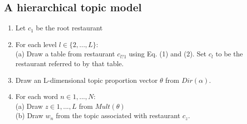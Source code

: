 \documentclass[a4paper]{article}
\begin{document}
\subsection{A hierarchical topic model}

\begin{enumerate}
\item Let $c_1$ be the root restaurant
\item For each level $l \in \{2, . . . , L\}$: \\
	(a) Draw a table from restaurant $c_{l?1}$ using Eq. (1) and (2). Set $c_l$ to be the restaurant
referred to by that table.
\item  Draw an L-dimensional topic proportion vector $\theta$ from $Dir(\alpha)$.
\item For each word $n \in {1, . . . , N}$:\\
(a) Draw $z \in {1, . . . , L}$ from $Mult(\theta)$\\
(b) Draw $w_n$ from the topic associated with restaurant $c_z$.

\end{enumerate}








\end{document}
